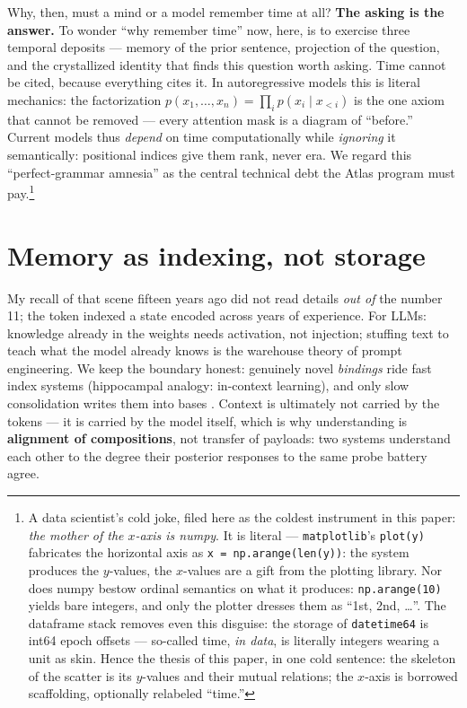 \documentclass[12pt, a4paper]{article}
\begin{document}
Why, then, must a mind or a model remember time at all? \textbf{The asking is the answer.} To wonder ``why remember time'' now, here, is to exercise three temporal deposits --- memory of the prior sentence, projection of the question, and the crystallized identity that finds this question worth asking. Time cannot be cited, because everything cites it. In autoregressive models this is literal mechanics: the factorization $p(x_1,\dots,x_n)=\prod_i p(x_i\mid x_{<i})$ is the one axiom that cannot be removed --- every attention mask is a diagram of ``before.'' Current models thus \emph{depend} on time computationally while \emph{ignoring} it semantically: positional indices give them rank, never era. We regard this ``perfect-grammar amnesia'' as the central technical debt the Atlas program must pay.\footnote{A data scientist's cold joke, filed here as the coldest instrument in this paper: \emph{the mother of the $x$-axis is numpy}. It is literal --- \texttt{matplotlib}'s \texttt{plot(y)} fabricates the horizontal axis as \texttt{x = np.arange(len(y))}: the system produces the $y$-values, the $x$-values are a gift from the plotting library. Nor does numpy bestow ordinal semantics on what it produces: \texttt{np.arange(10)} yields bare integers, and only the plotter dresses them as ``1st, 2nd, \ldots''. The dataframe stack removes even this disguise: the storage of \texttt{datetime64} is int64 epoch offsets --- so-called time, \emph{in data}, is literally integers wearing a unit as skin. Hence the thesis of this paper, in one cold sentence: the skeleton of the scatter is its $y$-values and their mutual relations; the $x$-axis is borrowed scaffolding, optionally relabeled ``time.''}

\section{Memory as indexing, not storage}
My recall of that scene fifteen years ago did not read details \emph{out of} the number 11; the token indexed a state encoded across years of experience. For LLMs: knowledge already in the weights needs activation, not injection; stuffing text to teach what the model already knows is the warehouse theory of prompt engineering. We keep the boundary honest: genuinely novel \emph{bindings} ride fast index systems (hippocampal analogy: in-context learning), and only slow consolidation writes them into bases \cite{cls1995,vonoswald2023}. Context is ultimately not carried by the tokens --- it is carried by the model itself, which is why understanding is \textbf{alignment of compositions}, not transfer of payloads: two systems understand each other to the degree their posterior responses to the same probe battery agree.
\end{document}
